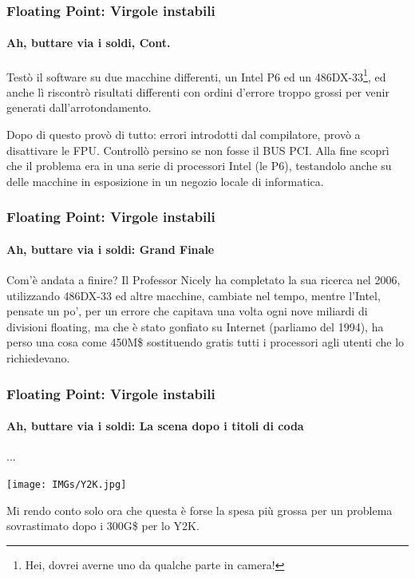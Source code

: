 \documentclass{beamer}
\begin{document}
	  \begin{frame}
	  		\frametitle{Floating Point: Virgole instabili}
	    \framesubtitle{Ah, buttare via i soldi, Cont.}
	  	    
	    Testò il software su due macchine differenti, un Intel P6 ed un 486DX-33\footnote{Hei,
	    dovrei averne uno da qualche parte in camera!}, ed anche lì riscontrò risultati differenti
	    con ordini d'errore troppo grossi per venir generati dall'arrotondamento.
	    
			\vspace{2em}	  	    
	    
	    Dopo di questo provò di tutto: errori introdotti dal compilatore, provò a disattivare le FPU.
	    Controllò persino se non fosse il BUS PCI. Alla fine scoprì che il problema era in una serie
	    di processori Intel (le P6), testandolo anche su delle macchine in esposizione in un negozio
	    locale di informatica.
	    
	  \end{frame}
	  
	  \begin{frame}
	  		\frametitle{Floating Point: Virgole instabili}
	    \framesubtitle{Ah, buttare via i soldi: Grand Finale}
	  	    
	    Com'è andata a finire? Il Professor Nicely ha completato la sua ricerca nel 2006, utilizzando
	    486DX-33 ed altre macchine, cambiate nel tempo, mentre l'Intel, pensate un po', per un errore
	    che capitava una volta ogni nove miliardi di divisioni floating, ma che è stato gonfiato su
	    Internet (parliamo del 1994), ha perso una cosa come 450M\$ sostituendo gratis tutti i processori
	    agli utenti che lo richiedevano.
	    
	  \end{frame}
	  
	  \begin{frame}
	  		\frametitle{Floating Point: Virgole instabili}
	    \framesubtitle{Ah, buttare via i soldi: La scena dopo i titoli di coda}
	  
	  		\begin{center}
	  		...
	  		\end{center}
	  		
	  		\pause
	    
			\begin{center}
	    		\texttt{[image: IMGs/Y2K.jpg]}
	    \end{center}	    
	    
	    \begin{center}
	    		Mi rendo conto solo ora che questa è forse la spesa più grossa per un problema
	    		sovrastimato dopo i 300G\$ per lo Y2K.
			\end{center}	    
	    
	  \end{frame}
	  
\end{document}
